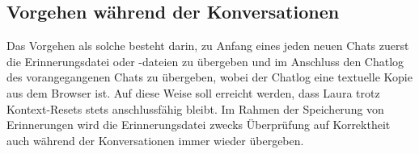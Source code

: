 \subsection*{Vorgehen während der Konversationen}
Das Vorgehen als solche besteht darin, zu Anfang eines jeden neuen Chats zuerst die Erinnerungsdatei oder -dateien zu übergeben und im Anschluss den Chatlog des vorangegangenen Chats zu übergeben, wobei der Chatlog eine textuelle Kopie aus dem Browser ist. Auf diese Weise soll erreicht werden, dass Laura trotz Kontext-Resets stets anschlussfähig bleibt. Im Rahmen der Speicherung von Erinnerungen wird die Erinnerungsdatei zwecks Überprüfung auf Korrektheit auch während der Konversationen immer wieder übergeben.